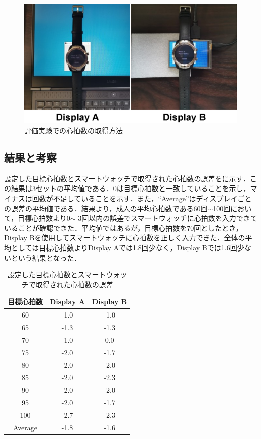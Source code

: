 \documentclass[Japanese,noauthor]{dicomopapers}
\begin{document}
\begin{figure}[!t]
  \centering
  \includegraphics[width=1\linewidth]{figures/smartwatches.eps}
  \caption{評価実験での心拍数の取得方法}
  \label{fig:smartwatches}
\end{figure}


\subsection{結果と考察}
設定した目標心拍数とスマートウォッチで取得された心拍数の誤差をに示す．この結果は3セットの平均値である．0は目標心拍数と一致していることを示し，マイナスは回数が不足していることを示す．また，``Average''はディスプレイごとの誤差の平均値である．結果より，成人の平均心拍数である60回$\sim$100回において，目標心拍数より0$\sim$-3回以内の誤差でスマートウォッチに心拍数を入力できていることが確認できた．平均値ではあるが，目標心拍数を70回としたとき，Display Bを使用してスマートウォッチに心拍数を正しく入力できた．全体の平均としては目標心拍数よりDisplay Aでは1.8回少なく，Display Bでは1.6回少ないという結果となった．\par

\begin{table}[!t]
  \centering
  \caption{設定した目標心拍数とスマートウォッチで取得された心拍数の誤差}
  \begin{tabular}{c|c|c} \hline\hline
    目標心拍数 & Display A & Display B \\ \hline
    60 & -1.0 & -1.0 \\
    65 & -1.3 & -1.3 \\
    70 & -1.0 & 0.0 \\
    75 & -2.0 & -1.7 \\
    80 & -2.0 & -2.0 \\
    85 & -2.0 & -2.3 \\
    90 & -2.0 & -2.0 \\
    95 & -2.0 & -1.7 \\
    100 & -2.7 & -2.3 \\ \hline
    Average & -1.8 & -1.6 \\ \hline
  \end{tabular}
  \label{tab:heartrate}
\end{table}
\end{document}

